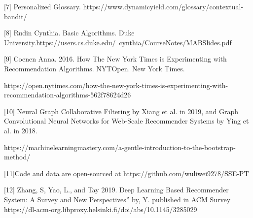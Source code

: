 \documentclass[english,twoside,censored,tkt,sw-line]{HYthesisML}
\begin{document}
[7] Personalized Glossary. https://www.dynamicyield.com/glossary/contextual-bandit/

[8] Rudin Cynthia. Basic Algorithms. Duke   
University.https://users.cs.duke.edu/~cynthia/CourseNotes/MABSlides.pdf

[9] Coenen Anna. 2016. How The New York Times is Experimenting with Recommendation Algorithms. NYTOpen. New York Times.
\begin{sloppypar}
https://open.nytimes.com/how-the-new-york-times-is-experimenting-with-recommendation-algorithms-562f78624d26
\end{sloppypar}

[10] Neural Graph Collaborative Filtering by Xiang et al. in 2019, and Graph Convolutional Neural Networks for Web-Scale Recommender Systems by Ying et al. in 2018.

\begin{sloppypar}
https://machinelearningmastery.com/a-gentle-introduction-to-the-bootstrap-method/
\end{sloppypar}


[11]Code and data are open-sourced at
https://github.com/wuliwei9278/SSE-PT

[12] Zhang, S, Yao, L., and Tay 2019. Deep Learning Based Recommender System: A Survey and New Perspectives” by, Y. published in ACM Survey 
\newline
https://dl-acm-org.libproxy.helsinki.fi/doi/abs/10.1145/3285029
\end{document}
